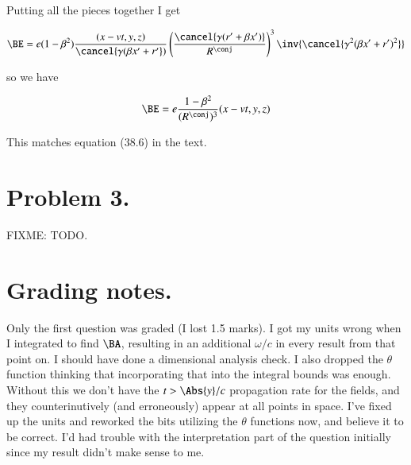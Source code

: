 Putting all the pieces together I get

\begin{align*}
\BE 
&= e (1 -\beta^2) \frac{(x - v t, y, z)}{\cancel{\gamma( \beta x' + r'})} \left( \frac{\cancel{\gamma( r' + \beta x')}}{R^\conj} \right)^3 \inv{\cancel{ \gamma^2 (\beta x' + r')^2 } } \\
\end{align*}

so we have

\begin{equation}\label{eqn:relElectroDynProblemSet5:1040}
\BE 
= e \frac{1 -\beta^2}{(R^\conj)^3} (x - v t, y, z) 
\end{equation}

This matches equation (38.6) in the text.  

\section{Problem 3.}

FIXME: TODO.

\section{Grading notes.}

Only the first question was graded (I lost 1.5 marks).  I got my units wrong when I integrated to find $\BA$, resulting in an additional $\omega/c$ in every result from that point on.  I should have done a dimensional analysis check.  I also dropped the $\theta$ function thinking that incorporating that into the integral bounds was enough.  Without this we don't have the $t > \Abs{y}/c$ propagation rate for the fields, and they counterinutively (and erroneously) appear at all points in space.  I've fixed up the units and reworked the bits utilizing the $\theta$ functions now, and believe it to be correct.  I'd had trouble with the interpretation part of the question initially since my result didn't make sense to me.

\EndArticle
